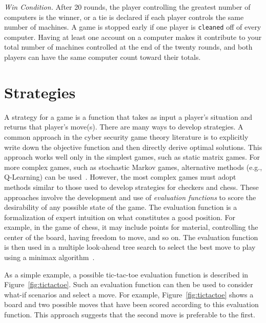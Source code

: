 \documentclass{sig-alternate-05-2015}
\begin{document}
{\em Win Condition.}
After 20 rounds, the player controlling the greatest number of computers is the winner, or a tie is declared if each player controls the same number of machines. 
A game is stopped early if one player is {\tt cleaned} off of every computer. 
Having at least one account on a computer makes it contribute to your total number of machines controlled at the end of the twenty rounds, and both players can have the same computer count toward their totals.  


\section{Strategies}
\label{sec:strategies}

A strategy for a game is a function that takes as input a player's situation and returns that player's move(s).
There are many ways to develop strategies. 
A common approach in the cyber security game theory literature is to explicitly write down the objective function and then directly derive optimal solutions. This approach works well only in the simplest games, such as static matrix games. For more complex games, such as stochastic Markov games, alternative methods (e.g., Q-Learning) can be used~\cite{alpcan2006intrusion}. However, the most complex games must adopt methods similar to those used to develop strategies for checkers and chess. These approaches involve the development and use of {\em evaluation functions} to score the desirability of any possible state of the game. The evaluation function is a formalization of expert intuition on what constitutes a good position. For example, in the game of chess, it may include points for material, controlling the center of the board, having freedom to move, and so on. The evaluation function is then used in a multiple look-ahead tree search to select the best move to play using a minimax algorithm~\cite{shannon1950programming}.

As a simple example, a possible tic-tac-toe evaluation function is described in Figure~\ref{fig:tictactoe}. Such an evaluation function can then be used to consider what-if scenarios and select a move. For example, Figure~\ref{fig:tictactoe} shows a board and two possible moves that have been scored according to this evaluation function. This approach suggests that the second move is preferable to the first. 
\end{document}
